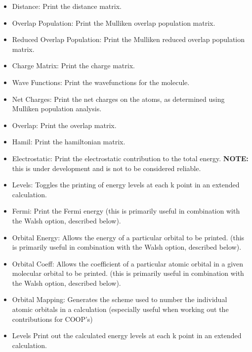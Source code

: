 \begin{itemize}

\item {\sf Distance:}
Print the distance matrix.

\item {\sf Overlap Population:}
Print the Mulliken overlap population matrix.

\item {\sf Reduced Overlap Population:}
Print the Mulliken reduced overlap population matrix.

\item {\sf Charge Matrix:}
Print the charge matrix.


\item {\sf Wave Functions:}
Print the wavefunctions for the molecule.

\item {\sf Net Charges:}
Print the net charges on the atoms, as determined using Mulliken
population analysis.

\item {\sf Overlap:}
Print the overlap matrix.

\item {\sf Hamil:}
Print the hamiltonian matrix.

\item {\sf Electrostatic:}
Print the electrostatic contribution to the total energy.  {\bf NOTE:}
this is under development and is not to be considered reliable.

\item {\sf Levels:}
Toggles the printing of energy levels at each k point in an extended
calculation. 

\item {\sf Fermi:}
Print the Fermi energy (this is primarily useful in combination with
the Walsh option, described below). 


\item {\sf Orbital Energy:}
Allows the energy of a particular orbital to be printed.  (this is
primarily useful in combination with 
the Walsh option, described below). 

\item {\sf Orbital Coeff:}
Allows the coefficient of a particular atomic orbital in a given
molecular orbital to be printed.  (this is
primarily useful in combination with 
the Walsh option, described below). 

\item {\sf Orbital Mapping:}
Generates the scheme used to number the individual atomic orbitals in a calculation (especially useful when working out the contributions for COOP's)

\item {\sf Levels}
Print out the calculated energy levels at each k point in an extended
calculation. 
\end{itemize}

